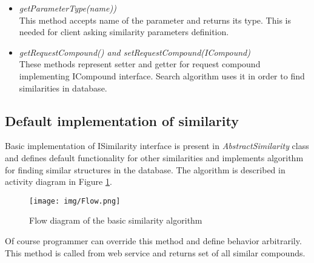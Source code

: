 \documentclass[thesis=M,english]{FITthesis}[2012/10/20]
\begin{document}
\begin{itemize}
\item \textit{getParameterType(name))}  \\ This method accepts name of the parameter and returns its type. This is needed for client asking similarity parameters definition.

\item \textit{getRequestCompound() and setRequestCompound(ICompound)}  \\ These methods represent setter and getter for request compound implementing ICompound interface. Search algorithm uses it in order to find similarities in database.

\end{itemize}



\subsection{Default implementation of similarity}
Basic implementation of ISimilarity interface is present in \textit{AbstractSimilarity} class and defines default functionality for other similarities and implements algorithm for finding similar structures in the database. The algorithm is described in activity diagram in Figure \ref{fig:activityDiagram}.

\begin{figure}
  \centering
  \texttt{[image: img/Flow.png]}
  \caption{Flow diagram of the basic similarity algorithm}
  \label{fig:activityDiagram}
\end{figure}

Of course programmer can override this method and define behavior arbitrarily. This method is called from web service and returns set of all similar compounds.
\end{document}
